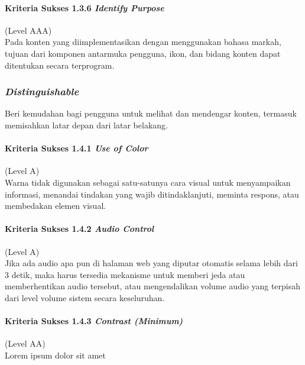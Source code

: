 \paragraph{Kriteria Sukses 1.3.6 \textit{Identify Purpose}}
\label{sec:kriteria_sukses_1.3.6}
(Level AAA)\\

Pada konten yang diimplementasikan dengan menggunakan bahasa markah, tujuan dari komponen antarmuka pengguna, ikon, dan bidang konten dapat ditentukan secara terprogram.

\subsubsection{\textit{Distinguishable}}
\label{sec:distinguishable}
Beri kemudahan bagi pengguna untuk melihat dan mendengar konten, termasuk memisahkan latar depan dari latar belakang.

\paragraph{Kriteria Sukses 1.4.1 \textit{Use of Color}}
\label{sec:kriteria_sukses_1.4.1}
(Level A)\\

Warna tidak digunakan sebagai satu-satunya cara visual untuk menyampaikan informasi, menandai tindakan yang wajib ditindaklanjuti, meminta respons, atau membedakan elemen visual.

\paragraph{Kriteria Sukses 1.4.2 \textit{Audio Control}}
\label{sec:kriteria_sukses_1.4.2}
(Level A)\\

Jika ada audio apa pun di halaman web yang diputar otomatis selama lebih dari 3 detik, maka harus tersedia mekanisme untuk memberi jeda atau memberhentikan audio tersebut, atau mengendalikan volume audio yang terpisah dari level volume sistem secara keseluruhan.

\paragraph{Kriteria Sukses 1.4.3 \textit{Contrast (Minimum)}}
\label{sec:kriteria_sukses_1.4.3}
(Level AA)\\

Lorem ipsum dolor sit amet

